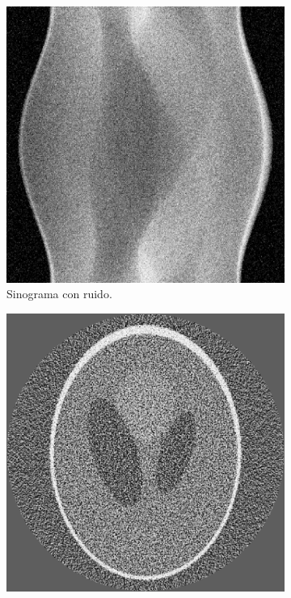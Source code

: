 \documentclass[letterpaper,12pt]{article}
\theoremstyle{plain}
\begin{document}
\begin{figure}[H]
   \centering
      \begin{subfigure}[h]{0.32\linewidth}
         \centering
         \includegraphics[width=\textwidth]{Figuras/sinograma_0.1.png}
         \caption{Sinograma con ruido.} 
         \label{fig:sinogram_0.1}
      \end{subfigure}
        \begin{subfigure}[h]{0.32\linewidth}
           \centering
           \includegraphics[width=\textwidth]{Figuras/reconstruction_ramp_EQ.png}

\end{subfigure}
\end{figure}
\end{document}
